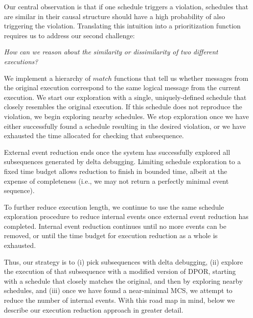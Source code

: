 Our central observation is that if one schedule triggers a violation,
schedules that are similar in their causal structure should have a high probability
of also triggering the violation. Translating this intuition into
a prioritization function requires us to address our second
challenge:

\begin{displayquote}
{\em How can we reason about the similarity or dissimilarity of two different
executions?}
\end{displayquote}

We implement a hierarchy of $match$ functions that tell us whether messages
from the original execution correspond to the same logical message from the current execution.
We start our exploration with a single,
uniquely-defined schedule that closely resembles the original execution.
If this schedule does not reproduce the violation, we begin exploring
nearby schedules. %
We stop exploration once we have either
successfully found a schedule resulting in
the desired violation, or we have exhausted the time allocated for
checking that subsequence.

External event reduction ends once the system has successfully explored all subsequences generated by delta debugging. Limiting schedule exploration to a fixed
time budget allows reduction to finish in bounded time, albeit at the
expense of completeness (i.e., we may not return a perfectly minimal event sequence).

To further reduce execution length, we continue to use the same schedule exploration procedure
to reduce internal events once external event reduction has
completed. Internal event reduction continues until no more events
can be removed, or until the time budget for execution reduction as a whole is exhausted.

Thus, our strategy is to (i) pick subsequences with
delta debugging, (ii) explore the execution of
that subsequence with a modified version of DPOR, starting with a schedule that closely matches the
original, and then by exploring nearby schedules, and
(iii) once we have found a near-minimal MCS, we attempt
to reduce the number of internal events.
With this road map in mind, below we describe our
execution reduction approach in
greater detail.

